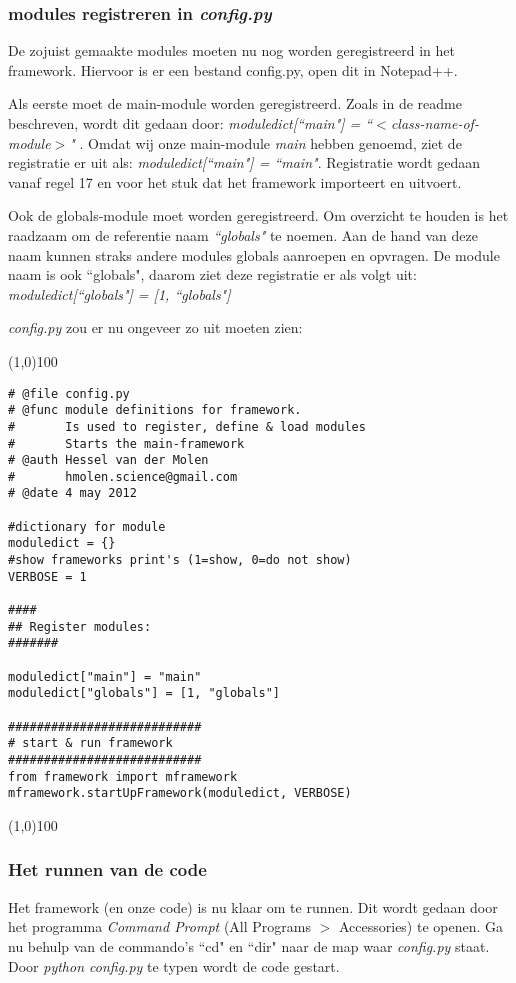 \documentclass[dutch, a4paper]{article}
\begin{document}
\subsubsection{modules registreren in \textit{config.py}}
De zojuist gemaakte modules moeten nu nog worden geregistreerd in het framework. Hiervoor is er een bestand config.py, open dit in Notepad++.

Als eerste moet de main-module worden geregistreerd. Zoals in de readme beschreven, wordt dit gedaan door:
 \textit{moduledict[``main"] = ``$<$class-name-of-module$>$" }. 
Omdat wij onze main-module \textit{main} hebben genoemd, ziet de registratie er uit als: \textit{moduledict[``main"] = ``main"}.
Registratie wordt gedaan vanaf regel 17 en voor het stuk dat het framework importeert en uitvoert.

Ook de globals-module moet worden geregistreerd. Om overzicht te houden is het raadzaam om de referentie naam \textit{``globals"} te noemen. Aan de hand van deze naam kunnen straks andere modules globals aanroepen en opvragen. De module naam is ook ``globals", daarom ziet deze registratie er als volgt uit: \textit{moduledict[``globals"] = [1, ``globals"]}

\textit{config.py} zou er nu ongeveer zo uit moeten zien:

\noindent \line(1,0){100}
\begin{verbatim}
# @file config.py
# @func module definitions for framework. 
#       Is used to register, define & load modules 
#       Starts the main-framework
# @auth Hessel van der Molen
#       hmolen.science@gmail.com
# @date 4 may 2012

#dictionary for module
moduledict = {}
#show frameworks print's (1=show, 0=do not show)
VERBOSE = 1

####
## Register modules:
#######

moduledict["main"] = "main"
moduledict["globals"] = [1, "globals"]

###########################
# start & run framework
###########################
from framework import mframework
mframework.startUpFramework(moduledict, VERBOSE)
\end{verbatim}
\noindent \line(1,0){100}

\subsubsection{Het runnen van de code}
Het framework (en onze code) is nu klaar om te runnen. Dit wordt gedaan door het programma \textit{Command Prompt} (All Programs $>$ Accessories) te openen. 
Ga nu behulp van de commando's ``cd"  en ``dir" naar de map waar \textit{config.py} staat.
Door \textit{python config.py} te typen wordt de code gestart.
\end{document}
